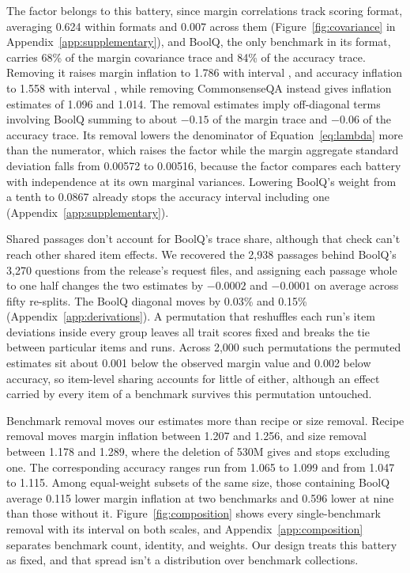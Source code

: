 The factor belongs to this battery, since margin correlations track scoring format, averaging 0.624 within formats and 0.007 across them (Figure~\ref{fig:covariance} in Appendix~\ref{app:supplementary}), and BoolQ, the only benchmark in its format, carries 68\% of the margin covariance trace and 84\% of the accuracy trace. Removing it raises margin inflation to 1.786 with interval , and accuracy inflation to 1.558 with interval , while removing CommonsenseQA instead gives inflation estimates of 1.096 and 1.014. The removal estimates imply off-diagonal terms involving BoolQ summing to about $-0.15$ of the margin trace and $-0.06$ of the accuracy trace. Its removal lowers the denominator of Equation~\ref{eq:lambda} more than the numerator, which raises the factor while the margin aggregate standard deviation falls from 0.00572 to 0.00516, because the factor compares each battery with independence at its own marginal variances. Lowering BoolQ's weight from a tenth to 0.0867 already stops the accuracy interval including one (Appendix~\ref{app:supplementary}).

Shared passages don't account for BoolQ's trace share, although that check can't reach other shared item effects. We recovered the 2,938 passages behind BoolQ's 3,270 questions from the release's request files, and assigning each passage whole to one half changes the two estimates by $-0.0002$ and $-0.0001$ on average across fifty re-splits. The BoolQ diagonal moves by 0.03\% and 0.15\% (Appendix~\ref{app:derivations}). A permutation that reshuffles each run's item deviations inside every group leaves all trait scores fixed and breaks the tie between particular items and runs. Across 2,000 such permutations the permuted estimates sit about 0.001 below the observed margin value and 0.002 below accuracy, so item-level sharing accounts for little of either, although an effect carried by every item of a benchmark survives this permutation untouched.

Benchmark removal moves our estimates more than recipe or size removal. Recipe removal moves margin inflation between 1.207 and 1.256, and size removal between 1.178 and 1.289, where the deletion of 530M gives  and stops excluding one. The corresponding accuracy ranges run from 1.065 to 1.099 and from 1.047 to 1.115. Among equal-weight subsets of the same size, those containing BoolQ average 0.115 lower margin inflation at two benchmarks and 0.596 lower at nine than those without it. Figure~\ref{fig:composition} shows every single-benchmark removal with its interval on both scales, and Appendix~\ref{app:composition} separates benchmark count, identity, and weights. Our design treats this battery as fixed, and that spread isn't a distribution over benchmark collections.

